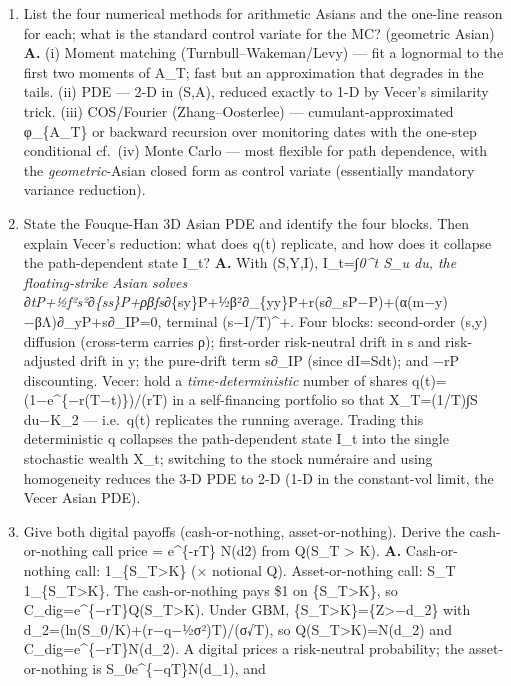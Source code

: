 \documentclass[
  11pt,
]{article}
\begin{document}
\begin{enumerate}
  cumulant-approximated/recursive cf, or Monte Carlo.
\item
  List the four numerical methods for arithmetic Asians and the one-line
  reason for each; what is the standard control variate for the MC?
  (geometric Asian) \textbf{A.} (i) Moment matching
  (Turnbull--Wakeman/Levy) --- fit a lognormal to the first two moments
  of A\_T; fast but an approximation that degrades in the tails. (ii)
  PDE --- 2-D in (S,A), reduced exactly to 1-D by Vecer's similarity
  trick. (iii) COS/Fourier (Zhang--Oosterlee) --- cumulant-approximated
  φ\_\{A\_T\} or backward recursion over monitoring dates with the
  one-step conditional cf.~(iv) Monte Carlo --- most flexible for path
  dependence, with the \emph{geometric}-Asian closed form as control
  variate (essentially mandatory variance reduction).
\item
  State the Fouque-Han 3D Asian PDE and identify the four blocks. Then
  explain Vecer's reduction: what does q(t) replicate, and how does it
  collapse the path-dependent state I\_t? \textbf{A.} With (S,Y,I),
  I\_t=∫\emph{0\^{}t S\_u du, the floating-strike Asian solves
  ∂\emph{tP+½f²s²∂}\{ss\}P+ρβfs∂}\{sy\}P+½β²∂\_\{yy\}P+r(s∂\_sP−P)+(α(m−y)−βΛ)∂\_yP+s∂\_IP=0,
  terminal (s−I/T)\^{}+. Four blocks: second-order (s,y) diffusion
  (cross-term carries ρ); first-order risk-neutral drift in s and
  risk-adjusted drift in y; the pure-drift term s∂\_IP (since dI=Sdt);
  and −rP discounting. Vecer: hold a \emph{time-deterministic} number of
  shares q(t)=(1−e\^{}\{−r(T−t)\})/(rT) in a self-financing portfolio so
  that X\_T=(1/T)∫S du−K\_2 --- i.e.~q(t) replicates the running
  average. Trading this deterministic q collapses the path-dependent
  state I\_t into the single stochastic wealth X\_t; switching to the
  stock numéraire and using homogeneity reduces the 3-D PDE to 2-D (1-D
  in the constant-vol limit, the Vecer Asian PDE).
\item
  Give both digital payoffs (cash-or-nothing, asset-or-nothing). Derive
  the cash-or-nothing call price = e\^{}\{-rT\} N(d2) from Q(S\_T
  \textgreater{} K). \textbf{A.} Cash-or-nothing call:
  1\_\{S\_T\textgreater K\} (× notional Q). Asset-or-nothing call: S\_T
  1\_\{S\_T\textgreater K\}. The cash-or-nothing pays \$1 on
  \{S\_T\textgreater K\}, so C\_dig=e\^{}\{−rT\}Q(S\_T\textgreater K).
  Under GBM, \{S\_T\textgreater K\}=\{Z\textgreater−d\_2\} with
  d\_2=(ln(S\_0/K)+(r−q−½σ²)T)/(σ√T), so Q(S\_T\textgreater K)=N(d\_2)
  and C\_dig=e\^{}\{−rT\}N(d\_2). A digital prices a risk-neutral
  probability; the asset-or-nothing is S\_0e\^{}\{−qT\}N(d\_1), and

\end{enumerate}
\end{document}

